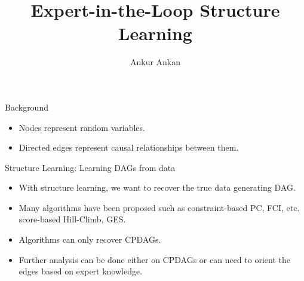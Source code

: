 \documentclass{beamer}
\begin{document}
\title[]{Expert-in-the-Loop Structure Learning}
\author{Ankur Ankan}
\date{}

\maketitle

\begin{frame}{Background}
	
	\begin{itemize}
		\item Nodes represent random variables.
		\item Directed edges represent causal relationships between them.
	\end{itemize}
\end{frame}

\begin{frame}{Structure Learning: Learning DAGs from data}
	\begin{figure}
		\centering
	\end{figure}

	\begin{itemize}
		\item With structure learning, we want to recover the true data generating DAG.
		\item Many algorithms have been proposed such as constraint-based PC, FCI, etc. score-based Hill-Climb, GES.
		\item Algorithms can only recover CPDAGs.
		\item Further analysis can be done either on CPDAGs or can need to orient the edges based on expert knowledge.
	\end{itemize}
\end{frame}
\end{document}
